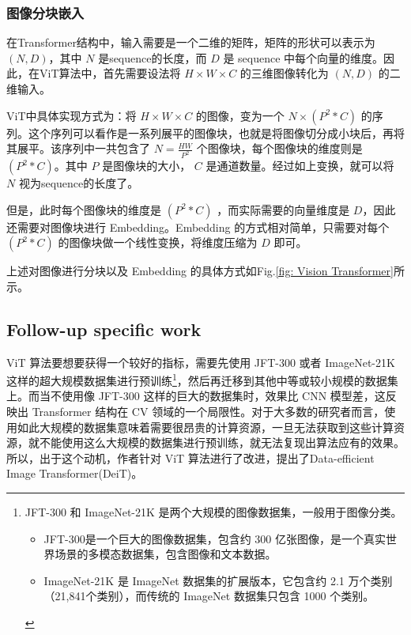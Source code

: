 \documentclass[letterpaper,10pt]{article}
\begin{document}
	\subsubsection{图像分块嵌入}
	
	在Transformer结构中，输入需要是一个二维的矩阵，矩阵的形状可以表示为$(N,D)$，其中 $N$ 是sequence的长度，而 $D$ 是 sequence 中每个向量的维度。因此，在ViT算法中，首先需要设法将 $H \times W \times C$ 的三维图像转化为 $\left( N,D \right)$ 的二维输入。
	
	ViT中具体实现方式为：将 $H \times W \times C$ 的图像，变为一个 $N \times \left( P^2 * C \right)$ 的序列。这个序列可以看作是一系列展平的图像块，也就是将图像切分成小块后，再将其展平。该序列中一共包含了 $N = \frac{HW}{P^2}$ 个图像块，每个图像块的维度则是 $\left(P^2 * C\right)$。其中 $P$ 是图像块的大小， $C$ 是通道数量。经过如上变换，就可以将 $N$ 视为sequence的长度了。

	但是，此时每个图像块的维度是 $\left(P^2 * C\right)$ ，而实际需要的向量维度是 $D$，因此还需要对图像块进行 Embedding。Embedding 的方式相对简单，只需要对每个 $\left(P^2 * C\right)$ 的图像块做一个线性变换，将维度压缩为 $D$ 即可。
	
	上述对图像进行分块以及 Embedding 的具体方式如Fig.\ref{fig: Vision Transformer}所示。
	
	\subsection{Follow-up specific work}
	
	ViT 算法要想要获得一个较好的指标，需要先使用 JFT-300 或者 ImageNet-21K 这样的超大规模数据集进行预训练\footnote{JFT-300 和 ImageNet-21K 是两个大规模的图像数据集，一般用于图像分类。
	\begin{itemize}
		\item {}
		JFT-300是一个巨大的图像数据集，包含约 300 亿张图像，是一个真实世界场景的多模态数据集，包含图像和文本数据。
		\item {}
		ImageNet-21K 是 ImageNet 数据集的扩展版本，它包含约 2.1 万个类别（21,841个类别），而传统的 ImageNet 数据集只包含 1000 个类别。
	\end{itemize}
	}，然后再迁移到其他中等或较小规模的数据集上。而当不使用像 JFT-300 这样的巨大的数据集时，效果比 CNN 模型差，这反映出 Transformer 结构在 CV 领域的一个局限性。对于大多数的研究者而言，使用如此大规模的数据集意味着需要很昂贵的计算资源，一旦无法获取到这些计算资源，就不能使用这么大规模的数据集进行预训练，就无法复现出算法应有的效果。所以，出于这个动机，作者针对 ViT 算法进行了改进，提出了Data-efficient Image Transformer(DeiT)。
	
\end{document}
